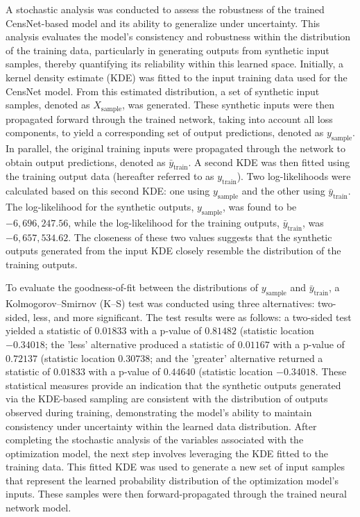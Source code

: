 A stochastic analysis was conducted to assess the robustness of the trained CensNet-based model and its ability to generalize under uncertainty. This analysis evaluates the model’s consistency and robustness within the distribution of the training data, particularly in generating outputs from synthetic input samples, thereby quantifying its reliability within this learned space. Initially, a kernel density estimate (KDE) was fitted to the input training data used for the CensNet model. From this estimated distribution, a set of synthetic input samples, denoted as \( X_{\text{sample}} \), was generated. These synthetic inputs were then propagated forward through the trained network, taking into account all loss components, to yield a corresponding set of output predictions, denoted as \( y_{\text{sample}} \). In parallel, the original training inputs were propagated through the network to obtain output predictions, denoted as \(\bar{y}_{\text{train}}\). A second KDE was then fitted using the training output data (hereafter referred to as \(y_{\text{train}}\)). Two log-likelihoods were calculated based on this second KDE: one using \(y_{\text{sample}}\) and the other using \(\bar{y}_{\text{train}}\). The log-likelihood for the synthetic outputs, \(y_{\text{sample}}\), was found to be \(-6,696,247.56\), while the log-likelihood for the training outputs, \(\bar{y}_{\text{train}}\), was \(-6,657,534.62\). The closeness of these two values suggests that the synthetic outputs generated from the input KDE closely resemble the distribution of the training outputs.

To evaluate the goodness-of-fit between the distributions of \( y_{\text{sample}} \) and \( \bar{y}_{\text{train}} \), a Kolmogorov–Smirnov (K–S) test was conducted using three alternatives: two-sided, less, and more significant. The test results were as follows: a two-sided test yielded a statistic of \( 0.01833 \) with a p-value of \( 0.81482 \) (statistic location \(-0.34018\); the 'less' alternative produced a statistic of \( 0.01167 \) with a p-value of \( 0.72137 \) (statistic location \(0.30738\); and the 'greater' alternative returned a statistic of \( 0.01833 \) with a p-value of \( 0.44640 \) (statistic location \(-0.34018\). These statistical measures provide an indication that the synthetic outputs generated via the KDE-based sampling are consistent with the distribution of outputs observed during training, demonstrating the model's ability to maintain consistency under uncertainty within the learned data distribution. After completing the stochastic analysis of the variables associated with the optimization model, the next step involves leveraging the KDE fitted to the training data. This fitted KDE was used to generate a new set of input samples that represent the learned probability distribution of the optimization model's inputs. These samples were then forward-propagated through the trained neural network model. 


